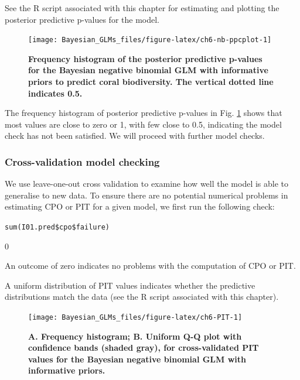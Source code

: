 \documentclass[
]{book}
\begin{document}
See the R script associated with this chapter for estimating and plotting the posterior predictive p-values for the model.



\begin{figure}

{\centering \texttt{[image: Bayesian\_GLMs\_files/figure-latex/ch6-nb-ppcplot-1]} 

}

\caption{\textbf{Frequency histogram of the posterior predictive p-values for the Bayesian negative binomial GLM with informative priors to predict coral biodiversity. The vertical dotted line indicates 0.5.}}\label{fig:ch6-nb-ppcplot}
\end{figure}

The frequency histogram of posterior predictive p-values in Fig. \ref{fig:ch6-nb-ppcplot} shows that most values are close to zero or 1, with few close to 0.5, indicating the model check has not been satisfied. We will proceed with further model checks.

\hypertarget{nbglm-cv}{%
\subsubsection{Cross-validation model checking}\label{nbglm-cv}}

We use leave-one-out cross validation to examine how well the model is able to generalise to new data. To ensure there are no potential numerical problems in estimating CPO or PIT for a given model, we first run the following check:

\texttt{sum(I01.pred\$cpo\$failure)}

0

An outcome of zero indicates no problems with the computation of CPO or PIT.

A uniform distribution of PIT values indicates whether the predictive distributions match the data (see the R script associated with this chapter).



\begin{figure}

{\centering \texttt{[image: Bayesian\_GLMs\_files/figure-latex/ch6-PIT-1]} 

}

\caption{\textbf{A. Frequency histogram; B. Uniform Q-Q plot with confidence bands (shaded gray), for cross-validated PIT values for the Bayesian negative binomial GLM with informative priors.}}\label{fig:ch6-PIT}
\end{figure}
\end{document}
